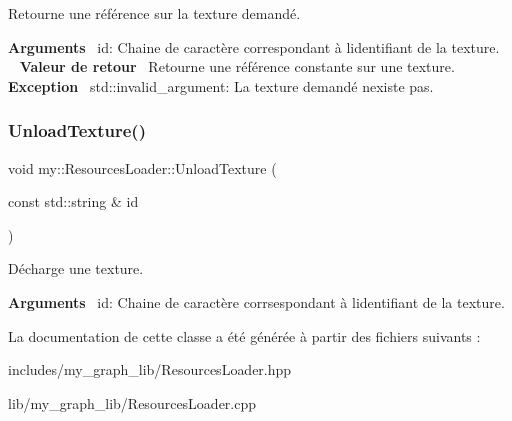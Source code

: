 Retourne une référence sur la texture demandé. 

{\bfseries Arguments}~\newline
 id\+: Chaine de caractère correspondant à l\textquotesingle{}identifiant de la texture. ~\newline
~\newline
 {\bfseries Valeur de retour}~\newline
 Retourne une référence constante sur une texture. ~\newline
~\newline
 {\bfseries Exception}~\newline
 std\+::invalid\+\_\+argument\+: La texture demandé n\textquotesingle{}existe pas. \mbox{\label{classmy_1_1ResourcesLoader_a546e03595e3740faed2223ed4b8f1fc2}} 
\subsubsection{\texorpdfstring{Unload\+Texture()}{UnloadTexture()}}
{\footnotesize\ttfamily void my\+::\+Resources\+Loader\+::\+Unload\+Texture (\begin{DoxyParamCaption}\item[{const std\+::string \&}]{id }\end{DoxyParamCaption})\hspace{0.3cm}{\ttfamily [static]}}



Décharge une texture. 

{\bfseries Arguments}~\newline
 id\+: Chaine de caractère corrsespondant à l\textquotesingle{}identifiant de la texture. 

La documentation de cette classe a été générée à partir des fichiers suivants \+:\begin{DoxyCompactItemize}
\item 
includes/my\+\_\+graph\+\_\+lib/Resources\+Loader.\+hpp\item 
lib/my\+\_\+graph\+\_\+lib/Resources\+Loader.\+cpp\end{DoxyCompactItemize}
